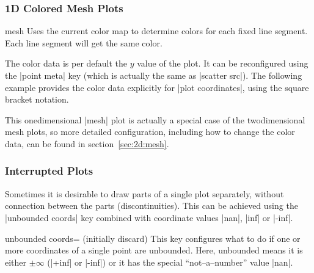 {\subsubsection{1D Colored Mesh Plots}
\label{sec:1d:mesh}
\begin{plottype}[/pgfplots]{mesh}
	Uses the current color map to determine colors for each fixed line segment. Each line segment will get the same color.
\begin{codeexample}[]
\end{codeexample}
	The color data is per default the $y$ value of the plot. It can be reconfigured using the |point meta| key (which is actually the same as |scatter src|). The following example provides the color data explicitly for |plot coordinates|, using the square bracket notation.
\begin{codeexample}[]
\end{codeexample}
	This onedimensional |mesh| plot is actually a special case of the twodimensional mesh plots, so more detailed configuration, including how to change the color data, can be found in section~\ref{sec:2d:mesh}.

\end{plottype}


\subsubsection{Interrupted Plots}
%
\label{pgfplots:interrupt}%
Sometimes it is desirable to draw parts of a single plot separately, without connection between the parts (discontinuities). This can be achieved using the |unbounded coords| key combined with coordinate values |nan|, |inf| or |-inf|.

\begin{pgfplotskey}{unbounded coords= (initially discard)}
	This key configures what to do if one or more coordinates of a single point are unbounded. Here, unbounded means it is either $\pm \infty$ (|+inf| or |-inf|) or it has the special ``not--a--number'' value |nan|.


\end{pgfplotskey}}
